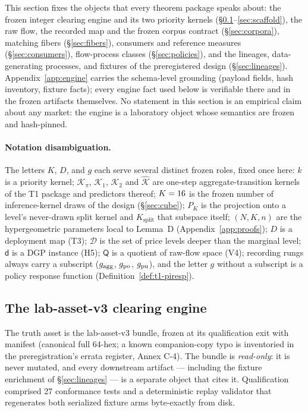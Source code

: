 This section fixes the objects that every theorem package speaks about: the
frozen integer clearing engine and its two priority kernels
(\S\ref{sec:engine}--\ref{sec:scaffold}), the raw flow, the recorded map and
the frozen corpus contract (\S\ref{sec:corpora}), matching fibers
(\S\ref{sec:fibers}), consumers and reference measures (\S\ref{sec:consumers}),
flow-process classes (\S\ref{sec:policies}), and the lineages, data-generating
processes, and fixtures of the preregistered design (\S\ref{sec:lineages}).
Appendix~\ref{app:engine} carries the schema-level grounding (payload fields,
hash inventory, fixture facts); every engine fact used below is verifiable
there and in the frozen artifacts themselves. No statement in this section is
an empirical claim about any market: the engine is a laboratory object whose
semantics are frozen and hash-pinned.

\paragraph{Notation disambiguation.} The letters $K$, $D$, and $g$ each
serve several distinct frozen roles, fixed once here: $k$ is a priority
kernel; $\mathcal{K}_{\pi}$, $\mathcal{K}_1$, $\mathcal{K}_2$ and
$\hat{\mathcal{K}}$ are one-step aggregate-transition kernels of the T1
package and predictors thereof; $K = 16$ is the frozen number of
inference-kernel draws of the design (\S\ref{sec:cube}); $P_K$ is the
projection onto a level's never-drawn split kernel and
$K_{\mathrm{split}}$ that subspace itself; $(N, K, n)$ are the
hypergeometric parameters local to Lemma~D (Appendix~\ref{app:proofs});
$D$ is a deployment map (T3); $\mathcal{D}$ is the set of price levels
deeper than the marginal level; $\mathsf{d}$ is a DGP instance (H5);
$\mathsf{Q}$ is a quotient of raw-flow space (V4); recording rungs always
carry a subscript ($g_{\mathrm{agg}}$, $g_{\mathrm{po}}$, $g_{\mathrm{pu}}$), and the letter $g$ without a
subscript is a policy response function (Definition~\ref{def:t1-piresp}).

\subsection{The lab-asset-v3 clearing engine}
\label{sec:engine}

The truth asset is the lab-asset-v3 bundle, frozen at its qualification exit
with manifest \bundlemanifest{} (canonical full 64-hex; a known companion-copy
typo is inventoried in the preregistration's errata register, Annex C-4). The
bundle is \emph{read-only}: it is never mutated, and every downstream artifact
--- including the fixture enrichment of \S\ref{sec:lineages} --- is a separate
object that cites it. Qualification comprised 27 conformance tests and a
deterministic replay validator that regenerates both serialized fixture arms
byte-exactly from disk.

